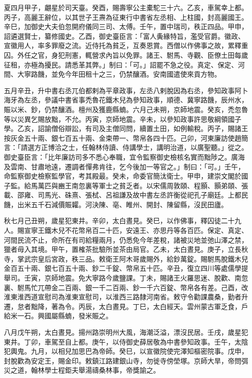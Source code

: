 \begin{pinyinscope}
 夏四月甲子，翽星於司天臺。癸酉，賜壽寧公主橐駝三十六。乙亥，車駕幸上都。丙子，高麗王辭位，以其世子王燾為征東行中書省左丞相、上柱國，封高麗國王。辛巳，加御史大夫伯忽開府儀同三司、太傅。壬午，置中瑞司，秩正四品。甲申，詔遴選賢士，纂修國史。乙酉，御史臺臣言：「富人夤緣特旨，濫受官爵。徽政、宣徽用人，率多罪廢之流。近侍托為貧乏，互奏恩賞。西僧以作佛事之故，累釋重囚。外任之官，身犯刑憲，輒營求內旨以免罪。諸王、駙馬、寺觀、臣僚土田每歲征租，亦極為擾民。請悉革其弊。」制曰：「可。」詔罷不急之役。真定、保定、河間、大寧路饑，並免今年田租十之三，仍禁釀酒。安南國遣使來貢方物。



 五月辛丑，升中書右丞兀伯都剌為平章政事，左丞八剌脫因為右丞，參知政事阿卜海牙為左丞，參議中書省事禿魯花鐵木兒為參知政事，順德、冀寧路饑，辰州水，賑以米、鈔，仍禁釀酒。檀州及獲鹿縣蝻。六月己未朔，京師地震。癸亥，禿忽魯等以災異乞賜放黜，不允。丙寅，京師地震。辛未，以參知政事許思敬綱領國子學。乙亥，詔諭僧俗辯訟，有司及主僧同問，續置土田，如例輸稅。丙子，賜諸王按灰金五十兩、銀七百五十兩、金束帶一、幣帛各四十匹。己卯，河東廉訪使趙簡言：「請選方正博洽之士，任翰林侍讀、侍講學士，講明治道，以廣聖聽。」從之。御史臺臣言：「比年廉訪司多不悉心奉職，宜令監察御史檢核名實而黜陟之。廣海及雲南、甘肅地遠，遷調者憚弗肯往，乞今後加一等官之。」制曰：「可。」壬午，命監察御史檢察監學官，考其殿最。癸未，命委官簡汰衛士。甲申，建崇文閣於國子監。給馬萬匹與豳王南忽裏等軍士之貧乏者。以宋儒周敦頤、程顥、顥弟頤、張載、邵雍、司馬光、硃熹、張栻、呂祖謙及故中書左丞許衡從祀孔子廟廷。上都民饑，出米五千石減價賑糶。河決陳、亳、睢州、開封、陳留縣，沒民田廬。



 秋七月己丑朔，歲星犯東井。辛卯，太白晝見。癸巳，以作佛事，釋囚徒二十九人。賜宣寧王鐵木兒不花幣帛百二十匹，安遠王、亦思丹等各百匹。保定、真定、河間民流不止，命所在有司給糧兩月，仍悉免今年差稅，諸被災地並弛山澤之禁，獵者毋入其境。甲午，置榷茶批驗所並茶由局官。乙未，太白晝見。庚子，立長秋寺，掌武宗皇后宮政，秩三品。敕衛王阿木哥歲賜外，給鈔萬錠。賜駙馬脫鐵木兒金百五十兩、銀七百五十兩、鈔二千錠、幣帛五十匹。辛丑，復立四川等處儒學提舉司。壬寅，京師地震。免大寧路今歲鹽課。丁未，賜諸王火羅思迷、脫歡、南忽裏、駙馬忙兀帶金二百兩、銀一千二百兩、鈔一千六百錠、幣帛各有差。己酉，改淮東淮西道宣慰司為淮東宣慰司，以淮西三路隸河南省。敕守令勸課農桑，勤者升遷，怠者黜降，著為令。丙辰，太白晝見。丁巳，太白經天。雲州蒙古軍乏食，戶給米一石。興國屬縣蝻，發米賑之。



 八月戊午朔，太白晝見。揚州路崇明州大風，海潮泛溢，漂沒民居。壬戌，歲星犯東井。丁卯，車駕至自上都。庚午，以侍御史薛居敬為中書參知政事。壬午，太陰犯輿鬼。九月，以相兒加思巴為帝師。癸巳，以宣徽院使完澤知樞密院事。戊申，封脫歡為安定王，賜金印。敕鎮江路建銀山寺，勿徙寺傍塋塚。京師大旱，帝問弭災之道，翰林學士程鉅夫舉湯禱桑林事，帝獎諭之。




\end{pinyinscope}
